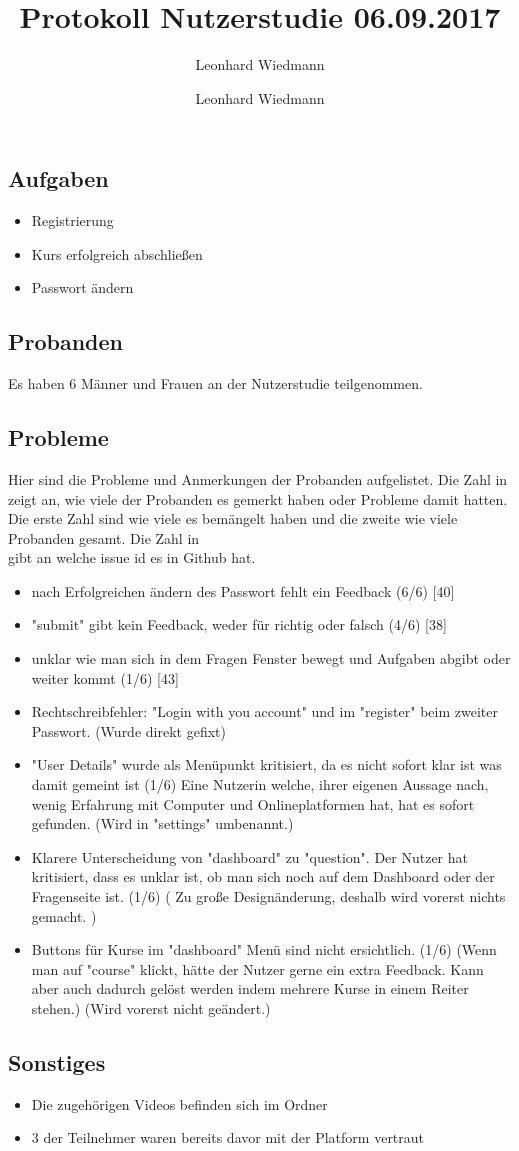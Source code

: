 \documentclass[colorback, accentcolor=tud1c, paper=a4]{tudexercise}
\title{Protokoll Nutzerstudie 06.09.2017}
\subtitle{Leonhard Wiedmann}
\author{Leonhard Wiedmann}
\begin{document}
\maketitle
\subsection*{Aufgaben}
\begin{itemize}
	\item Registrierung
	\item Kurs erfolgreich abschließen
	\item Passwort ändern
\end{itemize}

\subsection*{Probanden}
Es haben 6 Männer und Frauen an der Nutzerstudie teilgenommen.

\subsection*{Probleme}
  Hier sind die Probleme und Anmerkungen der Probanden aufgelistet. Die Zahl in \( \) zeigt an, wie viele der Probanden es gemerkt haben oder Probleme damit hatten. Die erste Zahl sind wie viele es bemängelt haben und die zweite wie viele Probanden gesamt. Die Zahl in \[ \] gibt an welche issue id es in Github hat.
  \begin{itemize}
    \item nach Erfolgreichen ändern des Passwort fehlt ein Feedback (6/6) [40]
		\item "submit" gibt kein Feedback, weder für richtig oder falsch (4/6) [38]
		\item unklar wie man sich in dem Fragen Fenster bewegt und Aufgaben abgibt oder weiter kommt (1/6) [43]
		\item Rechtschreibfehler: "Login with you account" und im "register" beim zweiter Passwort. (Wurde direkt gefixt)
		\item "User Details" wurde als Menüpunkt kritisiert, da es nicht sofort klar ist was damit gemeint ist (1/6) { Eine Nutzerin welche, ihrer eigenen Aussage nach, wenig Erfahrung mit Computer und Onlineplatformen hat, hat es sofort gefunden. } (Wird in "settings" umbenannt.)
		\item Klarere Unterscheidung von "dashboard" zu "question". Der Nutzer hat kritisiert, dass es unklar ist, ob man sich noch auf dem Dashboard oder der Fragenseite ist. (1/6) ( Zu große Designänderung, deshalb wird vorerst nichts gemacht. )
    \item Buttons für Kurse im "dashboard" Menü sind nicht ersichtlich. (1/6) (Wenn man auf "course" klickt, hätte der Nutzer gerne ein extra Feedback. Kann aber auch dadurch gelöst werden indem mehrere Kurse in einem Reiter stehen.) (Wird vorerst nicht geändert.)
   \end{itemize}

 \subsection*{Sonstiges}
 	\begin{itemize}
		\item Die zugehörigen Videos befinden sich im Ordner
		\item 3 der Teilnehmer waren bereits davor mit der Platform vertraut
	\end{itemize}
\end{document}

